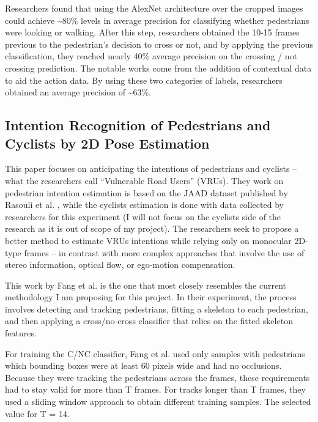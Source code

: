 \documentclass[journal,letterpaper]{IEEEtran}
\begin{document}
Researchers found that using the AlexNet architecture over the cropped images could achieve \textasciitilde80\% levels in average precision for classifying whether pedestrians were looking or walking. After this step, researchers obtained the 10-15 frames previous to the pedestrian's decision to cross or not, and by applying the previous classification, they reached nearly 40\% average precision on the crossing / not crossing prediction. The notable works come from the addition of contextual data to aid the action data. By using these two categories of labels, researchers obtained an average precision of \textasciitilde63\%.

\subsection{Intention Recognition of Pedestrians and Cyclists by 2D Pose Estimation}\label{intention-recognition-of-pedestrians-and-cyclists-by-2d-pose-estimation}

This paper focuses on anticipating the intentions of pedestrians and cyclists -- what the researchers call ``Vulnerable Road Users'' (VRUs).  They work on pedestrian intention estimation is based on the JAAD dataset published by Rasouli et al. \cite{rasouli2017ICCVW}, while the cyclists estimation is done with data collected by researchers for this experiment (I will not focus on the cyclists side of the research as it is out of scope of my project). The researchers seek to propose a better method to estimate VRUs intentions while relying only on monocular 2D-type frames -- in contrast with more complex approaches that involve the use of stereo information, optical flow, or ego-motion compensation.

This work by Fang et al. is the one that most closely resembles the current methodology I am proposing for this project. In their experiment, the process involves detecting and tracking pedestrians, fitting a skeleton to each pedestrian, and then applying a cross/no-cross classifier that relies on the fitted skeleton features.

For training the C/NC classifier, Fang et al. used only samples with pedestrians which bounding boxes were at least 60 pixels wide and had no occlusions. Because they were tracking the pedestrians across the frames, these requirements had to stay valid for more than T frames. For tracks longer than T frames, they used a sliding window approach to obtain different training samples. The selected value for T = 14.
\end{document}
